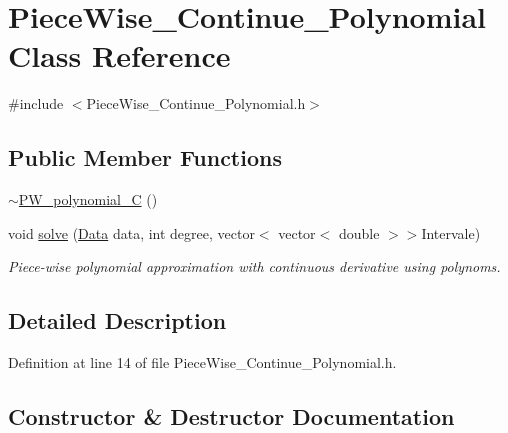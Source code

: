 \hypertarget{class_piece_wise___continue___polynomial}{}\section{Piece\+Wise\+\_\+\+Continue\+\_\+\+Polynomial Class Reference}
\label{class_piece_wise___continue___polynomial}


{\ttfamily \#include $<$Piece\+Wise\+\_\+\+Continue\+\_\+\+Polynomial.\+h$>$}

\subsection*{Public Member Functions}
\begin{DoxyCompactItemize}
\item 
\mbox{\hyperlink{class_piece_wise___continue___polynomial_a87b1f35076a85d484a680a9c0ce03d88}{$\sim$\+P\+W\+\_\+polynomial\+\_\+C}} ()
\item 
void \mbox{\hyperlink{class_piece_wise___continue___polynomial_af658537a378050635a735bbc0d7684e8}{solve}} (\mbox{\hyperlink{struct_data}{Data}} data, int degree, vector$<$ vector$<$ double $>$$>$Intervale)
\begin{DoxyCompactList}\small\item\em Piece-\/wise polynomial approximation with continuous derivative using polynoms. \end{DoxyCompactList}\end{DoxyCompactItemize}


\subsection{Detailed Description}


Definition at line 14 of file Piece\+Wise\+\_\+\+Continue\+\_\+\+Polynomial.\+h.



\subsection{Constructor \& Destructor Documentation}
\mbox{\label{class_piece_wise___continue___polynomial_a87b1f35076a85d484a680a9c0ce03d88}} 
